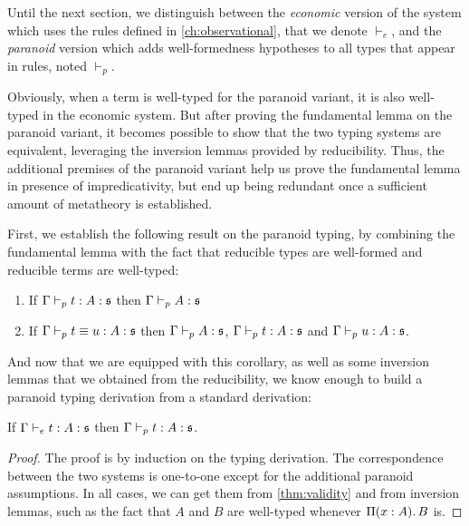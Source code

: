 % 
Until the next section, we distinguish between the \emph{economic} version of the 
system which uses the rules defined in \cref{ch:observational}, that we denote 
\( \vdash_e \), and the \emph{paranoid} version which adds well-formedness
hypotheses to all types that appear in rules, noted \( \vdash_p \).

Obviously, when a term is well-typed for the paranoid variant, it is
also well-typed in the economic system. But after proving the
fundamental lemma on the paranoid variant, it becomes possible to show
that the two typing systems are equivalent, leveraging the inversion
lemmas provided by reducibility.
%
% 
Thus, the additional premises of the paranoid variant help us
prove the fundamental lemma in presence of impredicativity, but end up
being redundant once a sufficient amount of metatheory is established.

First, we establish the following result on the paranoid
typing, by combining the fundamental lemma with the fact that
reducible types are well-formed and reducible terms are well-typed:
%
\begin{corollary} \label{thm:validity} \phantom{a}
  \begin{enumerate}
    \item If $\Gamma \vdash_{p} t : A : \mathfrak{s}$ then $\Gamma \vdash_{p} A : \mathfrak{s}$ 
    \item If $\Gamma \vdash_{p} t \equiv u : A : \mathfrak{s}$ then
  $\Gamma \vdash_{p} A : \mathfrak{s}$,
  $\Gamma \vdash_{p} t : A : \mathfrak{s}$ and $\Gamma \vdash_{p} u : A : \mathfrak{s}$.
  \end{enumerate}
\end{corollary}
%
And now that we are equipped with this corollary, as well as some
inversion lemmas that we obtained from the reducibility, we know
enough to build a paranoid typing derivation from a
standard derivation:
%
\begin{theorem}
  \label{thm:nonparanoid}
  If $\Gamma \vdash_{e} t : A : \mathfrak{s}$ then $\Gamma \vdash_{p} t : A : \mathfrak{s}$.
\end{theorem}
\begin{proof}
  The proof is by induction on the typing derivation. The
  correspondence between the two systems is one-to-one except for the
  additional paranoid assumptions.
  In all cases, we can get them from \cref{thm:validity} and from
  inversion lemmas, such as the fact that $A$ and $B$ are well-typed
  whenever $\Pi (x : A).\, {B}$ is.
\end{proof}

